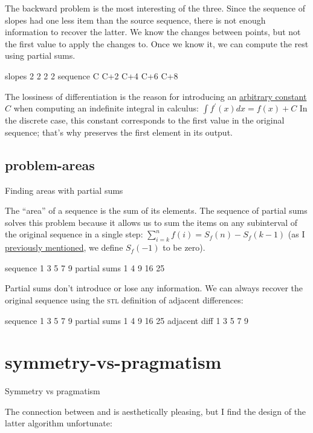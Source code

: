 \documentclass{article}
\begin{document}
The backward problem is the most interesting of the three.
Since the sequence of slopes had one less item than the source sequence,
there is not enough information to recover the latter.
We know the changes between points,
but not the first value to apply the changes to.
Once we know it, we can compute the rest using partial sums.

\begin{code}
  slopes       2    2    2    2
sequence  C  C+2  C+4  C+6  C+8
\end{code}

The lossiness of differentiation is the reason for introducing an \href{https://en.wikipedia.org/wiki/Constant_of_integration}{arbitrary constant} $C$
when computing an indefinite integral in calculus:
$\int f^\prime(x) dx = f(x) + C$
In the discrete case, this constant corresponds to the first value in the original sequence;
that's why  preserves the first element in its output.

\subsection{problem-areas}{Finding areas with partial sums}

The ``area'' of a sequence is the sum of its elements.
The sequence of partial sums solves this problem
because it allows us to sum the items on any subinterval of the original sequence in a single step:
$\sum_{i=k}^n f(i) = S_f(n) - S_f(k - 1)$
(as I \href{#off-by-one}{previously mentioned}, we define $S_f(-1)$ to be zero).

\begin{code}
    sequence  1   3   5   7   9
partial sums  1   4   9  16  25
\end{code}

Partial sums don't introduce or lose any information.
We can always recover the original sequence using the \textsc{stl} definition of adjacent differences:

\begin{code}
     sequence  1   3   5   7   9
 partial sums  1   4   9  16  25
adjacent diff  1   3   5   7   9
\end{code}

\section{symmetry-vs-pragmatism}{Symmetry vs pragmatism}

The connection between  and  is aesthetically pleasing,
but I find the design of the latter algorithm unfortunate:
\end{document}
